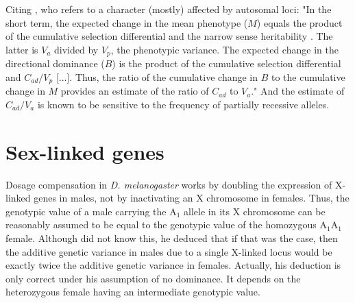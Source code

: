 \documentclass[a4paper,12pt]{article}
\begin{document}
Citing \citet{Kelly1999}, who refers to a character (mostly) affected by autosomal loci: "In the short term, the expected change in the mean phenotype ($M$) equals the product of the cumulative selection differential and the narrow sense heritability \citep{Falconer1989}. The latter is $V_a$ divided by $V_p$, the phenotypic variance. The expected change in the directional dominance ($B$) is the product of the cumulative selection differential and $C_{ad} / V_p$ [...]. Thus, the ratio of the cumulative change in $B$ to the cumulative change in $M$ provides an estimate of the ratio of $C_{ad}$ to $V_a$." And the estimate of $C_{ad}/V_a$ is known to be sensitive to the frequency of partially recessive alleles.

\section{Sex-linked genes}
Dosage compensation in \emph{D. melanogaster} works by doubling the expression of X-linked genes in males, not by inactivating an X chromosome in females. Thus, the genotypic value of a male carrying the A$_1$ allele in its X chromosome can be reasonably assumed to be equal to the genotypic value of the homozygous A$_1$A$_1$ female. Although \citet{James1973} did not know this, he deduced that if that was the case, then the additive genetic variance in males due to a single X-linked locus would be exactly twice the additive genetic variance in females. Actually, his deduction is only correct under his assumption of no dominance. It depends on the heterozygous female having an intermediate genotypic value. 


\end{document}
